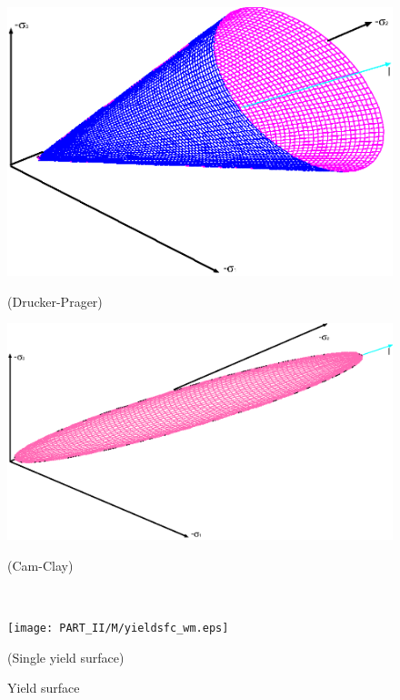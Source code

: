 \begin{figure}[!htb]
  \begin{center}
   \begin{minipage}[t]{0.48\textwidth}
     \begin{center}
    \includegraphics[scale=0.28]{PART_II/M/yieldsfc_dp.eps}
    \centerline{(Drucker-Prager)}
    \end{center}
   \end{minipage}
   \hspace{0.02\textwidth}
   \begin{minipage}[t]{0.48\textwidth}
    \begin{center}
    \includegraphics[scale=0.28]{PART_II/M/yieldsfc_cam.eps}\\
    \centerline{(Cam-Clay)}
    \end{center}
   \end{minipage}\\
   \begin{minipage}[t]{0.48\textwidth}
     \begin{center}
    \texttt{[image: PART\_II/M/yieldsfc\_wm.eps]}
    \centerline{(Single yield surface)}
    \end{center}
   \end{minipage}
  \end{center}
  \caption{Yield surface}
  \label{Mp_fig:yieldsfc}
\end{figure}

